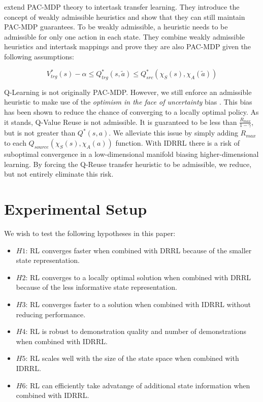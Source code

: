 \documentclass[10pt,a4paper]{article}
\begin{document}
\citeauthor{Mann2012}  extend PAC-MDP theory to intertask transfer learning. They introduce the concept of weakly admissible heuristics and show that they can still maintain PAC-MDP guarantees. To be weakly admissible, a heuristic needs to be admissible for only one action in each state. They combine weakly admissible heuristics and intertask mappings and prove they are also PAC-MDP given the following assumptions:

\begin{equation}
V^*_{trg}(s) - \alpha \leq Q^*_{trg}(s,\widetilde{a}) \leq Q^*_{src}(\chi_S(s), \chi_A(\widetilde{a}))
\end{equation}

Q-Learning is not originally PAC-MDP. However, we still enforce an admissible heuristic to make use of the \textit{optimism in the face of uncertainty} bias \cite{Brafman:2003:RGP:944919.944928}. This bias has been shown to reduce the chance of converging to a locally optimal policy. As it stands, Q-Value Reuse is not admissible. It is guaranteed to be less than $\frac{R_{max}}{1-\gamma}$, but is not greater than $Q^*(s,a)$.  We alleviate this issue by simply adding $R_{max}$ to each $Q_{source}(\chi_S(s), \chi_A(a))$ function. With IDRRL there is a risk of suboptimal convergence in a low-dimensional manifold biasing higher-dimensional learning. By forcing the Q-Reuse transfer heuristic to be admissible, we reduce, but not entirely eliminate this risk.


\section{Experimental Setup}
We wish to test the following hypotheses in this paper:

\begin{itemize}
\setlength\itemsep{0.01em}
\item $H1$: RL converges faster when combined with DRRL because of the smaller state representation. 
\item $H2$: RL converges to a locally optimal solution when combined with DRRL because of the less informative state representation.
\item $H3$: RL converges faster to a solution when combined with IDRRL without reducing performance.
\item $H4$: RL is robust to demonstration quality and number of demonstrations when combined with IDRRL.
\item $H5$: RL scales well with the size of the state space when combined with IDRRL.
\item $H6$: RL can efficiently take advatange of additional state information when combined with IDRRL.
\end{itemize}
\end{document}
